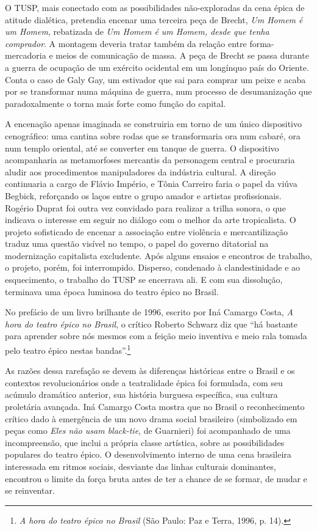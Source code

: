 O TUSP, mais conectado com as possibilidades não-exploradas da cena
épica de atitude dialética, pretendia encenar uma terceira peça de
Brecht, \textit{Um Homem é um Homem}, rebatizada de \textit{Um Homem é um
Homem, desde que tenha comprador}. A montagem deveria tratar também da
relação entre forma-mercadoria e meios de comunicação de massa. A peça
de Brecht se passa durante a guerra de ocupação de um exército ocidental
em um longínquo país do Oriente. Conta o caso de Galy Gay, um estivador
que sai para comprar um peixe e acaba por se transformar numa máquina de
guerra, num processo de desumanização que paradoxalmente o torna mais
forte como função do capital.

A encenação apenas imaginada se construiria em torno de um único
dispositivo cenográfico: uma cantina sobre rodas que se transformaria
ora num cabaré, ora num templo oriental, até se converter em tanque de
guerra. O dispositivo acompanharia as metamorfoses mercantis da
personagem central e procuraria aludir aos procedimentos manipuladores
da indústria cultural. A direção continuaria a cargo de Flávio Império,
e Tônia Carreiro faria o papel da viúva Begbick, reforçando os laços
entre o grupo amador e artistas profissionais. Rogério Duprat foi outra
vez convidado para realizar a trilha sonora, o que indicava o interesse
em seguir no diálogo com o melhor da arte tropicalista. O projeto
sofisticado de encenar a associação entre violência e mercantilização
traduz uma questão visível no tempo, o papel do governo ditatorial na
modernização capitalista excludente. Após alguns ensaios e encontros de
trabalho, o projeto, porém, foi interrompido. Disperso, condenado à
clandestinidade e ao esquecimento, o trabalho do TUSP se encerrava ali.
E com sua dissolução, terminava uma época luminosa do teatro épico no
Brasil.

No prefácio de um livro brilhante de 1996, escrito por Iná Camargo
Costa, \textit{A hora do teatro épico no Brasil}, o crítico Roberto Schwarz
diz que “há bastante para aprender sobre nós mesmos com a feição meio
inventiva e meio rala tomada pelo teatro épico nestas
bandas”.\footnote{\textit{A hora do teatro épico no Brasil} (São Paulo: Paz
  e Terra, 1996, p. 14).}

As razões dessa rarefação se devem às diferenças históricas entre o
Brasil e os contextos revolucionários onde a teatralidade épica foi
formulada, com seu acúmulo dramático anterior, sua história burguesa
específica, sua cultura proletária avançada. Iná Camargo Costa mostra
que no Brasil o reconhecimento crítico dado à emergência de um novo
drama social brasileiro (simbolizado em peças como \textit{Eles não usam
black-tie}, de Guarnieri) foi acompanhado de uma incompreensão, que
inclui a própria classe artística, sobre as possibilidades populares do
teatro épico. O desenvolvimento interno de uma cena brasileira
interessada em ritmos sociais, desviante das linhas culturais
dominantes, encontrou o limite da força bruta antes de ter a chance de
se formar, de mudar e se reinventar.

